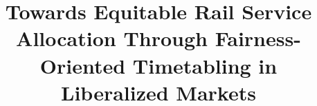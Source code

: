 \documentclass[preprint,12pt]{elsarticle}
\begin{document}
\begin{frontmatter}



\title{Towards Equitable Rail Service Allocation Through Fairness-Oriented Timetabling in Liberalized Markets} %






\end{frontmatter}
\end{document}
